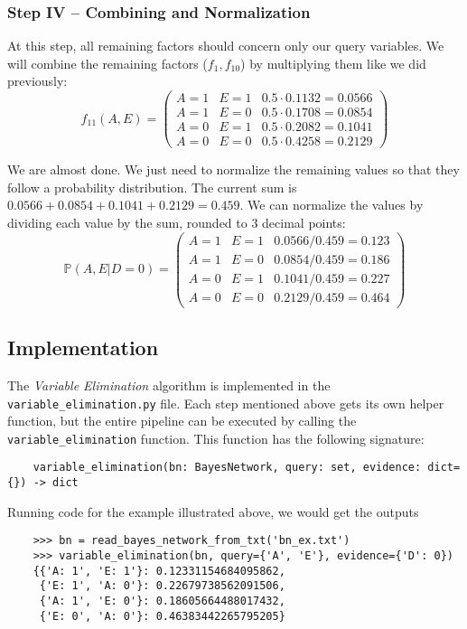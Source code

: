 \documentclass{article}
\theoremstyle{definition}
\renewcommand{\P}{\mathbb{P}}
\begin{document}
\subsubsection{Step IV -- Combining and Normalization}

At this step, all remaining factors should concern only our query variables. We will combine the remaining factors (\(f_1, f_{10}\)) by multiplying them like we did previously:
\[f_{11}(A, E) = \begin{pmatrix}
    A = 1 & E = 1 & 0.5\cdot 0.1132 = 0.0566 \\
    A = 1 & E = 0 & 0.5\cdot 0.1708 = 0.0854 \\
    A = 0 & E = 1 & 0.5\cdot 0.2082 = 0.1041 \\
    A = 0 & E = 0 & 0.5\cdot 0.4258 = 0.2129
\end{pmatrix}\]

We are almost done. We just need to normalize the remaining values so that they follow a probability distribution. The current sum is \(0.0566 + 0.0854 + 0.1041 + 0.2129 = 0.459\). We can normalize the values by dividing each value by the sum, rounded to 3 decimal points:
\[\P(A, E | D = 0) = \begin{pmatrix}
    A = 1 & E = 1 & 0.0566/0.459 = 0.123 \\
    A = 1 & E = 0 & 0.0854/0.459 = 0.186 \\
    A = 0 & E = 1 & 0.1041/0.459 = 0.227 \\
    A = 0 & E = 0 & 0.2129/0.459 = 0.464
\end{pmatrix}\]

\subsection{Implementation}

The \textit{Variable Elimination} algorithm is implemented in the \texttt{variable\_elimination.py} file. Each step mentioned above gets its own helper function, but the entire pipeline can be executed by calling the \texttt{variable\_elimination} function. This function has the following signature:

\begin{verbatim}
    variable_elimination(bn: BayesNetwork, query: set, evidence: dict={}) -> dict
\end{verbatim}

Running code for the example illustrated above, we would get the outputs

\begin{verbatim}
    >>> bn = read_bayes_network_from_txt('bn_ex.txt')
    >>> variable_elimination(bn, query={'A', 'E'}, evidence={'D': 0})
    {{'A: 1', 'E: 1'}: 0.12331154684095862,
     {'E: 1', 'A: 0'}: 0.22679738562091506,
     {'A: 1', 'E: 0'}: 0.18605664488017432,
     {'E: 0', 'A: 0'}: 0.46383442265795205}
\end{verbatim}
\end{document}
